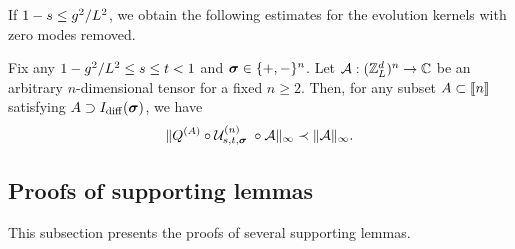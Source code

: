 If $1-s \le g^2/L^{2}$, we obtain the following estimates for the evolution kernels with zero modes removed.
    \begin{lemma}\label{lem:sum_decay_nonzero}
Fix any $1-g^2/L^{2}\le s \le t<1$ and ${\boldsymbol{\sigma}}\in \{+,-\}^n$. Let ${\mathcal A}: ({\mathbb Z}_L^d)^{n}\to \mathbb C$ be an arbitrary $n$-dimensional tensor for a fixed $n\ge 2$. Then, for any subset $A\subset \llbracket{n}\rrbracket$ satisfying $A\supset I_{\mathrm{diff}}({\boldsymbol{\sigma}})$, we have  
\begin{align}\label{sum_res_Ndecay_nonzero}
	\| Q^{(A)}\circ {\mathcal U}^{(n)}_{s,t,{\boldsymbol{\sigma}}}\;\circ {\mathcal A}\|_{\infty} \prec \|{\mathcal A}\|_{\infty} .
\end{align}
\end{lemma}


\subsection{Proofs of supporting lemmas}\label{subsec:support}

This subsection presents the proofs of several supporting lemmas.

